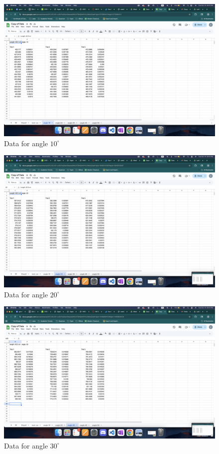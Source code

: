 \documentclass{article}
\begin{document}
\begin{figure}[h!]
    \centering
    \includegraphics[width=150mm]{angle_10.png}
    \caption{Data for angle $10^\circ$}
\end{figure}
\begin{figure}[h!]
    \centering
    \includegraphics[width=150mm]{angle_20.png}
    \caption{Data for angle $20^\circ$}
\end{figure}
\begin{figure}[h!]
    \centering
    \includegraphics[width=150mm]{angle_30.png}
    \caption{Data for angle $30^\circ$}
\end{figure}
\end{document}
